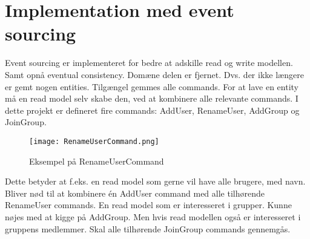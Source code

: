 \section{Implementation med event sourcing}
Event sourcing er implementeret for bedre at adskille read og write modellen. Samt opnå eventual consistency.
Domæne delen er fjernet. Dvs. der ikke længere er gemt nogen entities. Tilgængel gemmes alle commands.
For at lave en entity må en read model selv skabe den, ved at kombinere alle relevante commands.
I dette projekt er defineret fire commands: AddUser, RenameUser, AddGroup og JoinGroup.
\begin{figure}[H]
	\center
	\texttt{[image: RenameUserCommand.png]}
	\caption{Eksempel på RenameUserCommand}
	\label{fig:RenameUserCommandl}
\end{figure}
Dette betyder at f.eks. en read model som gerne vil have alle brugere, med navn. Bliver nød til at kombinere én AddUser command med alle tilhørende RenameUser commands.
En read model som er interesseret i grupper. Kunne nøjes med at kigge på AddGroup. Men hvis read modellen også er interesseret i gruppens medlemmer. Skal alle tilhørende JoinGroup commands gennemgås.

